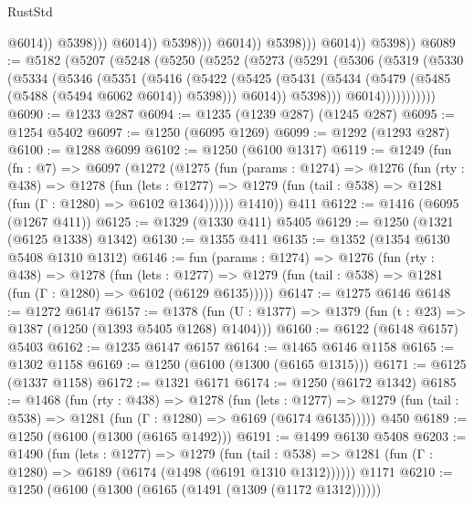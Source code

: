\begin{lexlean}{RustStd}
\begin{coremodule}
                                          @6014))
                                      @5398)))
                                @6014))
                            @5398)))
                      @6014))
                  @5398)))
            @6014))
        @5398))
@6089 := @5182
    (@5207
      (@5248
        (@5250
          (@5252
            (@5273
              (@5291
                (@5306
                  (@5319
                    (@5330
                      (@5334
                        (@5346
                          (@5351
                            (@5416
                              (@5422
                                (@5425
                                  (@5431
                                    (@5434 (@5479 (@5485 (@5488 (@5494 @6062 @6014)) @5398)))
                                    @6014))
                                @5398)))
                          @6014)))))))))))
@6090 := @1233 @287
@6094 := @1235 (@1239 @287) (@1245 @287)
@6095 := @1254 @5402
@6097 := @1250 (@6095 @1269)
@6099 := @1292 (@1293 @287)
@6100 := @1288 @6099
@6102 := @1250 (@6100 @1317)
@6119 := @1249
    (fun (fn : @7) =>
    @6097
      (@1272
        (@1275
          (fun (params : @1274) =>
          @1276
            (fun (rty : @438) =>
            @1278
              (fun (lets : @1277) =>
              @1279 (fun (tail : @538) => @1281 (fun (Γ : @1280) => @6102 @1364))))))
        @1410))
    @411
@6122 := @1416 (@6095 (@1267 @411))
@6125 := @1329 (@1330 @411) @5405
@6129 := @1250 (@1321 (@6125 @1338) @1342)
@6130 := @1355 @411
@6135 := @1352 (@1354 @6130 @5408 @1310 @1312)
@6146 := fun (params : @1274) =>
  @1276
    (fun (rty : @438) =>
    @1278
      (fun (lets : @1277) =>
      @1279 (fun (tail : @538) => @1281 (fun (Γ : @1280) => @6102 (@6129 @6135)))))
@6147 := @1275 @6146
@6148 := @1272 @6147
@6157 := @1378 (fun (U : @1377) => @1379 (fun (t : @23) => @1387 (@1250 (@1393 @5405 @1268) @1404)))
@6160 := @6122 (@6148 @6157) @5403
@6162 := @1235 @6147 @6157
@6164 := @1465 @6146 @1158
@6165 := @1302 @1158
@6169 := @1250 (@6100 (@1300 (@6165 @1315)))
@6171 := @6125 (@1337 @1158)
@6172 := @1321 @6171
@6174 := @1250 (@6172 @1342)
@6185 := @1468
    (fun (rty : @438) =>
    @1278
      (fun (lets : @1277) =>
      @1279 (fun (tail : @538) => @1281 (fun (Γ : @1280) => @6169 (@6174 @6135)))))
    @450
@6189 := @1250 (@6100 (@1300 (@6165 @1492)))
@6191 := @1499 @6130 @5408
@6203 := @1490
    (fun (lets : @1277) =>
    @1279
      (fun (tail : @538) => @1281 (fun (Γ : @1280) => @6189 (@6174 (@1498 (@6191 @1310 @1312))))))
    @1171
@6210 := @1250 (@6100 (@1300 (@6165 (@1491 (@1309 (@1172 @1312))))))

\end{coremodule}
\end{lexlean}
